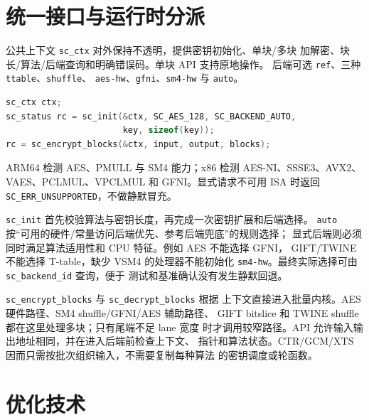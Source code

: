 \documentclass[11pt,a4paper,UTF8,fontset=none]{ctexart}
\begin{document}
\section{统一接口与运行时分派}

公共上下文 \texttt{sc\_ctx} 对外保持不透明，提供密钥初始化、单块/多块
加解密、块长/算法/后端查询和明确错误码。单块 API 支持原地操作。
后端可选 \texttt{ref}、三种 \texttt{ttable}、\texttt{shuffle}、
\texttt{aes-hw}、\texttt{gfni}、\texttt{sm4-hw} 与 \texttt{auto}。

\begin{lstlisting}[language=C,caption={统一接口的核心调用}]
sc_ctx ctx;
sc_status rc = sc_init(&ctx, SC_AES_128, SC_BACKEND_AUTO,
                       key, sizeof(key));
rc = sc_encrypt_blocks(&ctx, input, output, blocks);
\end{lstlisting}

ARM64 检测 AES、PMULL 与 SM4 能力；x86 检测 AES-NI、SSSE3、AVX2、
VAES、PCLMUL、VPCLMUL 和 GFNI。显式请求不可用 ISA 时返回
\texttt{SC\_ERR\_UNSUPPORTED}，不做静默冒充。

\texttt{sc\_init} 首先校验算法与密钥长度，再完成一次密钥扩展和后端选择。
\texttt{auto} 按“可用的硬件/常量访问后端优先、参考后端兜底”的规则选择；
显式后端则必须同时满足算法适用性和 CPU 特征。例如 AES 不能选择 GFNI，
GIFT/TWINE 不能选择 T-table，缺少 VSM4 的处理器不能初始化
\texttt{sm4-hw}。最终实际选择可由 \texttt{sc\_backend\_id} 查询，便于
测试和基准确认没有发生静默回退。

\texttt{sc\_encrypt\_blocks} 与 \texttt{sc\_decrypt\_blocks} 根据
上下文直接进入批量内核。AES 硬件路径、SM4 shuffle/GFNI/AES 辅助路径、
GIFT bitslice 和 TWINE shuffle 都在这里处理多块；只有尾端不足 lane 宽度
时才调用较窄路径。API 允许输入输出地址相同，并在进入后端前检查上下文、
指针和算法状态。CTR/GCM/XTS 因而只需按批次组织输入，不需要复制每种算法
的密钥调度或轮函数。

\section{优化技术}
\end{document}
